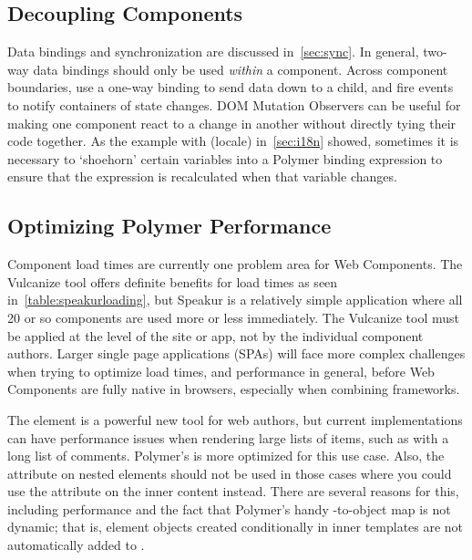 \subsection{Decoupling Components}
Data bindings and synchronization are discussed in~\cref{sec:sync}.
In general, two-way data bindings should only be used \textit{within} a component.
Across component boundaries, use a one-way binding to send data down to a child,
and fire events to notify containers of state changes.
DOM Mutation Observers can be useful for making one component react to a change in another without directly tying their code together.
As the example with  (locale) in~\cref{sec:i18n} showed, 
sometimes it is necessary to `shoehorn' certain variables into a Polymer binding expression 
to ensure that the expression is recalculated when that variable changes.

\subsection{Optimizing Polymer Performance}
Component load times are currently one problem area for Web Components.
The Vulcanize tool offers definite benefits for load times as seen in~\cref{table:speakurloading},
but Speakur is a relatively simple application where all 20 or so components are used more or less immediately.
The Vulcanize tool must be applied at the level of the site or app, not by the individual component authors.
Larger single page applications (SPAs) will face more complex challenges when trying to optimize load times, and performance in general,
before Web Components are fully native in browsers, especially when combining frameworks.

The  element is a powerful new tool for web authors, 
but current implementations can have performance issues when rendering large lists of items, such as with a long list of comments. 
Polymer's  is more optimized for this use case.
Also, the  attribute on nested  elements should not be used in those cases where you could use the  attribute on the inner content instead.
There are several reasons for this, including performance and 
the fact that Polymer's handy  -to-object map is not dynamic; 
that is, element objects created conditionally in inner templates are not automatically added to .

